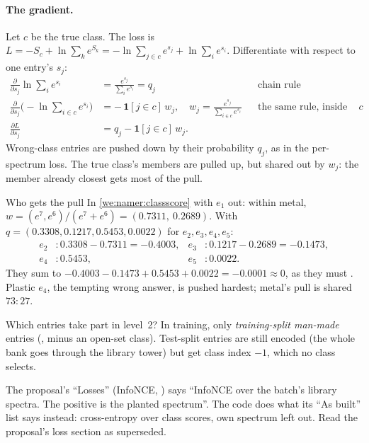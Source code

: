 \paragraph{The gradient.}\label{par:namer:l2grad} Let $c$ be the true class. The loss is
$L=-S_c+\ln\sum_{k}e^{S_k}=-\ln\sum_{j\in c}e^{s_j}+\ln\sum_i e^{s_i}$. Differentiate with respect to one entry's
$s_j$:
\begin{align*}
\frac{\partial}{\partial s_j}\ln\sum_i e^{s_i} &= \frac{e^{s_j}}{\sum_i e^{s_i}} = q_j &&\text{chain rule}\\
\frac{\partial}{\partial s_j}\Big(-\ln\sum_{i\in c}e^{s_i}\Big) &= -\,\mathbf{1}[j\in c]\,w_j,\quad
 w_j=\frac{e^{s_j}}{\sum_{i\in c}e^{s_i}} &&\text{the same rule, inside class }c\\
\frac{\partial L}{\partial s_j} &= q_j-\mathbf{1}[j\in c]\,w_j .
\end{align*}
Wrong-class entries are pushed down by their probability $q_j$, as in the per-spectrum loss. The true class's members
are pulled up, but shared out by $w_j$: the member already closest gets most of the pull.

\begin{worked}[label={we:namer:gradient}]{Who gets the pull}
In \cref{we:namer:classscore} with $e_1$ out: within metal, $w=(e^7,e^6)/(e^7+e^6)=(0.7311,\ 0.2689)$. With
$q=(0.3308,0.1217,0.5453,0.0022)$ for $e_2,e_3,e_4,e_5$:
\begin{align*}
e_2 &: 0.3308-0.7311=-0.4003, & e_3 &: 0.1217-0.2689=-0.1473,\\
e_4 &: 0.5453, & e_5 &: 0.0022 .
\end{align*}
They sum to $-0.4003-0.1473+0.5453+0.0022=-0.0001\approx0$, as they must \tagC. Plastic $e_4$, the tempting wrong
answer, is pushed hardest; metal's pull is shared $73:27$.
\end{worked}

Which entries take part in level~2? In training, only \emph{training-split man-made} entries (, minus an
open-set class). Test-split entries are still encoded (the whole bank goes through the library tower) but get class
index $-1$, which no class selects.

\begin{sourcenote}
The proposal's ``Losses'' (InfoNCE, \citealp{oord2018representation}) says ``InfoNCE over the batch's library spectra.
The positive is the planted spectrum''. The code does what its ``As built'' list says instead: cross-entropy over class
scores, own spectrum left out. Read the proposal's loss section as superseded.
\end{sourcenote}

